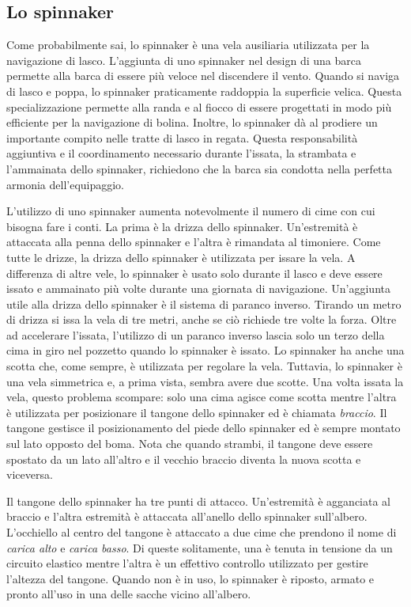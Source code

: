\subsection{Lo spinnaker}
\label{subsec:spinnaker}
Come probabilmente sai, lo spinnaker è una vela ausiliaria utilizzata
per la navigazione di lasco. L'aggiunta di uno spinnaker nel design di una barca
permette alla barca di essere più veloce nel discendere il vento. Quando si
naviga di lasco e poppa, lo spinnaker praticamente raddoppia la superficie
velica. Questa specializzazione permette alla randa e al fiocco di essere
progettati in modo più efficiente per la navigazione di bolina. Inoltre, lo
spinnaker dà al prodiere un importante compito nelle tratte di lasco in regata.
Questa responsabilità aggiuntiva e il coordinamento necessario durante l'issata,
la strambata e l'ammainata dello spinnaker, richiedono che la barca sia
condotta nella perfetta armonia dell'equipaggio.

L'utilizzo di uno spinnaker aumenta notevolmente il numero di cime con cui
bisogna fare i conti. La prima è la drizza dello spinnaker. Un'estremità è
attaccata alla penna dello spinnaker e l'altra è rimandata al timoniere. Come
tutte le drizze, la drizza dello spinnaker è utilizzata per issare la vela. A
differenza di altre vele, lo spinnaker è usato solo durante il lasco e deve
essere issato e ammainato più volte durante una giornata di navigazione.
Un'aggiunta utile alla drizza dello spinnaker è il sistema di paranco inverso.
Tirando un metro di drizza si issa la vela di tre metri, anche se ciò richiede
tre volte la forza. Oltre ad accelerare l'issata, l'utilizzo di un paranco
inverso lascia solo un terzo della cima in giro nel pozzetto quando lo spinnaker
è issato. Lo spinnaker ha anche una scotta che, come sempre, è utilizzata per
regolare la vela. Tuttavia, lo spinnaker è una vela simmetrica e, a prima vista,
sembra avere due scotte. Una volta issata la vela, questo problema scompare:
solo una cima agisce come scotta mentre l'altra è utilizzata per posizionare il
tangone dello spinnaker ed è chiamata \emph{braccio}. Il tangone gestisce il
posizionamento del piede dello spinnaker ed è sempre montato sul lato opposto
del boma. Nota che quando strambi, il tangone deve essere spostato da un lato
all'altro e il vecchio braccio diventa la nuova scotta e viceversa.

Il tangone dello spinnaker ha tre punti di attacco. Un'estremità è agganciata al
braccio e l'altra estremità è attaccata all'anello dello spinnaker sull'albero.
L'occhiello al centro del tangone è attaccato a due cime che prendono il nome di
\emph{carica alto} e \emph{carica basso}. Di queste solitamente, una è tenuta in
tensione da un circuito elastico mentre l'altra è un effettivo controllo
utilizzato per gestire l'altezza del tangone. Quando non è in uso, lo spinnaker
è riposto, armato e pronto all'uso in una delle sacche vicino all'albero.

